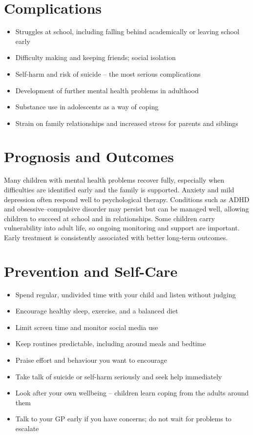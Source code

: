 \section*{Complications}
\begin{itemize}
    \item Struggles at school, including falling behind academically or leaving school early
    \item Difficulty making and keeping friends; social isolation
    \item Self-harm and risk of suicide -- the most serious complications
    \item Development of further mental health problems in adulthood
    \item Substance use in adolescents as a way of coping
    \item Strain on family relationships and increased stress for parents and siblings
\end{itemize}

\section*{Prognosis and Outcomes}
Many children with mental health problems recover fully, especially when difficulties are identified early and the family is supported. Anxiety and mild depression often respond well to psychological therapy. Conditions such as ADHD and obsessive--compulsive disorder may persist but can be managed well, allowing children to succeed at school and in relationships. Some children carry vulnerability into adult life, so ongoing monitoring and support are important. Early treatment is consistently associated with better long-term outcomes.

\section*{Prevention and Self-Care}
\begin{itemize}
    \item Spend regular, undivided time with your child and listen without judging
    \item Encourage healthy sleep, exercise, and a balanced diet
    \item Limit screen time and monitor social media use
    \item Keep routines predictable, including around meals and bedtime
    \item Praise effort and behaviour you want to encourage
    \item Take talk of suicide or self-harm seriously and seek help immediately
    \item Look after your own wellbeing -- children learn coping from the adults around them
    \item Talk to your GP early if you have concerns; do not wait for problems to escalate
\end{itemize}

